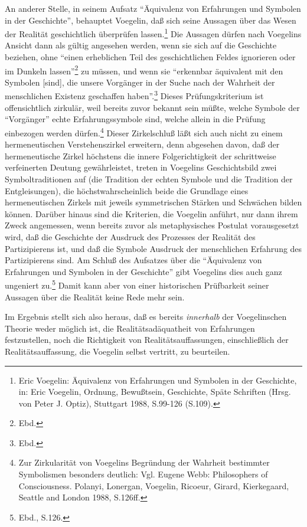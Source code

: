 An anderer Stelle, in seinem Aufsatz "`Äquivalenz von Erfahrungen und Symbolen
in der Geschichte"', behauptet Voegelin, daß sich seine Aussagen über das
Wesen der Realität geschichtlich überprüfen lassen.\footnote{Eric Voegelin:
  Äquivalenz von Erfahrungen und Symbolen in der Geschichte, in: Eric
  Voegelin, Ordnung, Bewußtsein, Geschichte, Späte Schriften (Hrsg. von Peter
  J. Optiz), Stuttgart 1988, S.99-126 (S.109).} Die Aussagen dürfen nach
Voegelins Ansicht dann als gültig angesehen werden, wenn sie sich auf die
Geschichte beziehen, ohne "`einen erheblichen Teil des geschichtlichen Feldes
ignorieren oder im Dunkeln lassen"'\footnote{Ebd.} zu müssen, und wenn sie
"`erkennbar äquivalent mit den Symbolen [sind], die unsere Vorgänger in der
Suche nach der Wahrheit der menschlichen Existenz geschaffen
haben"'.\footnote{Ebd.} Dieses Prüfungskriterium ist offensichtlich zirkulär,
weil bereits zuvor bekannt sein müßte, welche Symbole der "`Vorgänger"'
echte Erfahrungssymbole sind, welche allein in die Prüfung einbezogen
werden dürfen.\footnote{Zur Zirkularität von Voegelins Begründung der Wahrheit
  bestimmter Symbolismen besonders deutlich: Vgl. Eugene Webb: Philosophers of
  Consciousness. Polanyi, Lonergan, Voegelin, Ricoeur, Girard, Kierkegaard,
  Seattle and London 1988, S.126ff.} Dieser Zirkelschluß läßt sich auch nicht
zu einem hermeneutischen Verstehenszirkel erweitern, denn abgesehen davon,
daß der hermeneutische Zirkel höchstens die innere Folgerichtigkeit
der schrittweise verfeinerten Deutung gewährleistet, treten in Voegelins
Geschichtsbild zwei Symboltraditionen auf (die Tradition der echten Symbole
und die Tradition der Entgleisungen), die höchstwahrscheinlich beide die
Grundlage eines hermeneutischen Zirkels mit jeweils symmetrischen Stärken und
Schwächen bilden können. Darüber hinaus sind die Kriterien, die Voegelin
anführt, nur dann ihrem Zweck angemessen, wenn bereits zuvor als
metaphysisches Postulat vorausgesetzt wird, daß die Geschichte der Ausdruck
des Prozesses der Realität des Partizipierens ist, und daß die Symbole
Ausdruck der menschlichen Erfahrung des Partizipierens sind. Am Schluß des
Aufsatzes über die "`Äquivalenz von Erfahrungen und Symbolen in der
Geschichte"' gibt Voegelins dies auch ganz ungeniert zu.\footnote{Ebd.,
  S.126.} Damit kann aber von einer historischen Prüfbarkeit seiner Aussagen
über die Realität keine Rede mehr sein.

Im Ergebnis stellt sich also heraus, daß es bereits {\it innerhalb} der
Voegelinschen Theorie weder möglich ist, die Realitätsadäquatheit von
Erfahrungen festzustellen, noch die Richtigkeit von Realitätsauffassungen,
einschließlich der Realitätsauffassung, die Voegelin selbst vertritt, zu
beurteilen.

